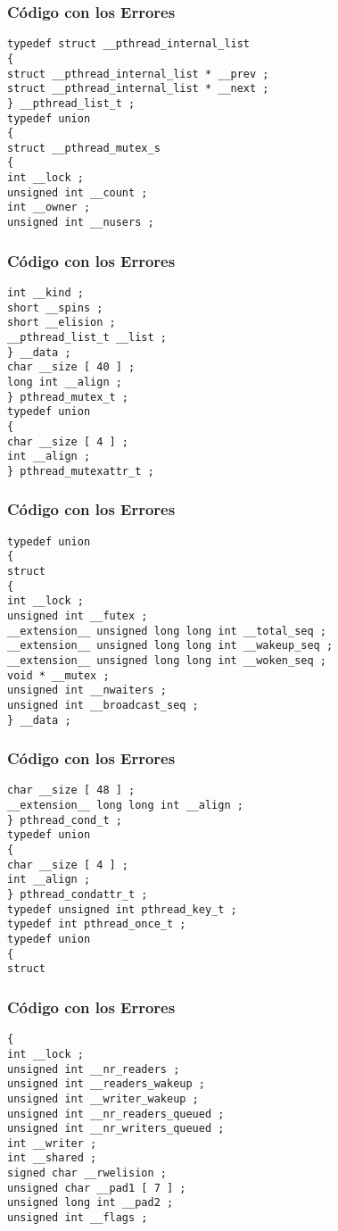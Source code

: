 \documentclass{beamer}
\begin{document}
\begin{frame}[fragile]
\frametitle{C\'odigo con los Errores}
\begin{verbatim}
typedef struct __pthread_internal_list 
{ 
struct __pthread_internal_list * __prev ; 
struct __pthread_internal_list * __next ; 
} __pthread_list_t ; 
typedef union 
{ 
struct __pthread_mutex_s 
{ 
int __lock ; 
unsigned int __count ; 
int __owner ; 
unsigned int __nusers ; 
\end{verbatim}
\end{frame}
\begin{frame}[fragile]
\frametitle{C\'odigo con los Errores}
\begin{verbatim}
int __kind ; 
short __spins ; 
short __elision ; 
__pthread_list_t __list ; 
} __data ; 
char __size [ 40 ] ; 
long int __align ; 
} pthread_mutex_t ; 
typedef union 
{ 
char __size [ 4 ] ; 
int __align ; 
} pthread_mutexattr_t ; 
\end{verbatim}
\end{frame}
\begin{frame}[fragile]
\frametitle{C\'odigo con los Errores}
\begin{verbatim}
typedef union 
{ 
struct 
{ 
int __lock ; 
unsigned int __futex ; 
__extension__ unsigned long long int __total_seq ; 
__extension__ unsigned long long int __wakeup_seq ; 
__extension__ unsigned long long int __woken_seq ; 
void * __mutex ; 
unsigned int __nwaiters ; 
unsigned int __broadcast_seq ; 
} __data ; 
\end{verbatim}
\end{frame}
\begin{frame}[fragile]
\frametitle{C\'odigo con los Errores}
\begin{verbatim}
char __size [ 48 ] ; 
__extension__ long long int __align ; 
} pthread_cond_t ; 
typedef union 
{ 
char __size [ 4 ] ; 
int __align ; 
} pthread_condattr_t ; 
typedef unsigned int pthread_key_t ; 
typedef int pthread_once_t ; 
typedef union 
{ 
struct 
\end{verbatim}
\end{frame}
\begin{frame}[fragile]
\frametitle{C\'odigo con los Errores}
\begin{verbatim}
{ 
int __lock ; 
unsigned int __nr_readers ; 
unsigned int __readers_wakeup ; 
unsigned int __writer_wakeup ; 
unsigned int __nr_readers_queued ; 
unsigned int __nr_writers_queued ; 
int __writer ; 
int __shared ; 
signed char __rwelision ; 
unsigned char __pad1 [ 7 ] ; 
unsigned long int __pad2 ; 
unsigned int __flags ; 
\end{verbatim}
\end{frame}
\end{document}
